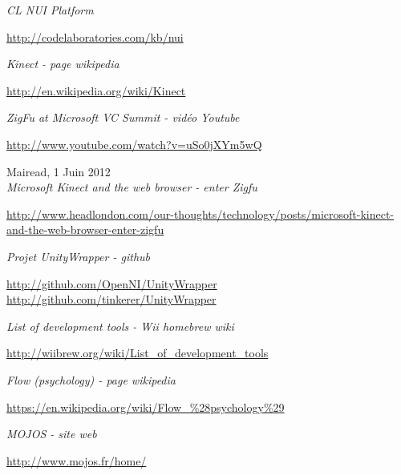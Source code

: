 \begin{thebibliography}{9}
  \emph{CL NUI Platform}\\
  \begin{small}
  \url{http://codelaboratories.com/kb/nui}
  \end{small}
  
  \emph{Kinect - page wikipedia}\\
  \begin{small}
  \url{http://en.wikipedia.org/wiki/Kinect}
  \end{small}
  
  \emph{ZigFu at Microsoft VC Summit - vidéo Youtube}\\
  \begin{small}
  \url{http://www.youtube.com/watch?v=uSo0jXYm5wQ}
  \end{small}
  
  Mairead, 1 Juin 2012\\
  \emph{Microsoft Kinect and the web browser - enter Zigfu}\\
  \begin{small}
  \url{http://www.headlondon.com/our-thoughts/technology/posts/microsoft-kinect-and-the-web-browser-enter-zigfu}
  \end{small}
  
  \emph{Projet UnityWrapper - github}\\
  \begin{small}
  \url{http://github.com/OpenNI/UnityWrapper}\\
  \url{http://github.com/tinkerer/UnityWrapper}
  \end{small}
  
  \emph{List of development tools - Wii homebrew wiki}\\
  \begin{small}
  \url{http://wiibrew.org/wiki/List_of_development_tools}
  \end{small}
  
  \emph{Flow (psychology) - page wikipedia}\\
  \begin{small}
  \url{https://en.wikipedia.org/wiki/Flow_\%28psychology\%29}
  \end{small}
  
  \emph{MOJOS - site web}\\
  \begin{small}
  \url{http://www.mojos.fr/home/}
  \end{small}
  

\end{thebibliography}
